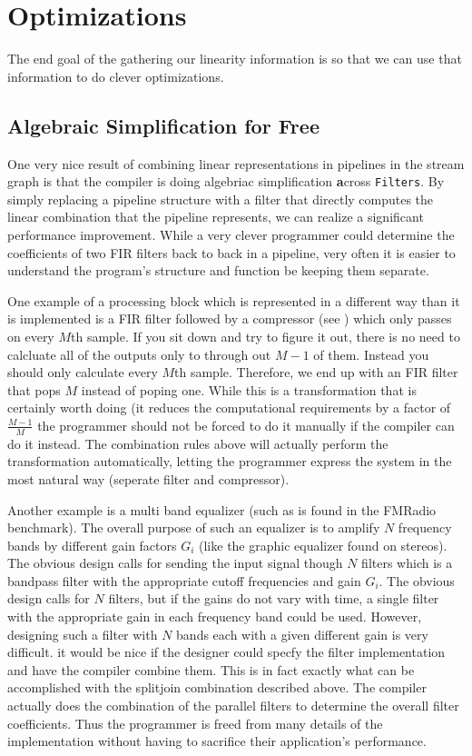 \section{Optimizations}
The end goal of the gathering our linearity information is so that we can use
that information to do clever optimizations. 


\subsection{Algebraic Simplification for Free}
One very nice result of combining
linear representations in pipelines in the stream graph is that  
the compiler is doing algebriac simplification {\textbf across} {\tt Filters}. 
By simply replacing a pipeline structure with a filter that directly computes
the linear combination that the pipeline represents, we can realize a significant
performance improvement. While a very clever programmer could determine the coefficients 
of two FIR filters back to back in a pipeline, very often it is easier to understand the
program's structure and function be keeping them separate. 

One example of a processing block which is represented in a different way than
it is implemented is a FIR filter followed by a compressor 
(see \cite{oppenheim-discrete}) which only passes on every $M$th sample. 
If you sit down and try to figure it out, there is no need to calcluate all of the outputs
only to through out $M-1$ of them. Instead you should only calculate every $M$th sample.
Therefore, we end up with an FIR filter that pops $M$ instead of poping one. While
this is a transformation that is certainly worth doing (it reduces the computational
requirements by a factor of $\frac{M-1}{M}$ the programmer should not be forced to do
it manually if the compiler can do it instead. The combination rules above will
actually perform the transformation automatically, letting the programmer
express the system in the most natural way (seperate filter and compressor).

Another example is a multi band equalizer (such as is found in the FMRadio benchmark). 
The overall purpose of such an equalizer is to amplify $N$ frequency bands by 
different gain factors $G_i$ (like the graphic equalizer found on stereos). 
The obvious design calls for sending the input signal though $N$ filters
which is a bandpass filter with the appropriate cutoff frequencies and gain $G_i$.
The obvious design calls for $N$ filters, but if the gains do 
not vary with time, a single filter with the appropriate gain in each frequency band
could be used. However, designing such a filter with $N$ bands each with a given
different gain is very difficult. it would be nice if the designer could specfy the 
filter implementation and have the compiler combine them. This is in fact exactly what
can be accomplished with the splitjoin combination described above. The compiler 
actually does the combination of the parallel filters to determine the overall 
filter coefficients. Thus the programmer is freed from many details of the
implementation without having to sacrifice their application's performance. 


